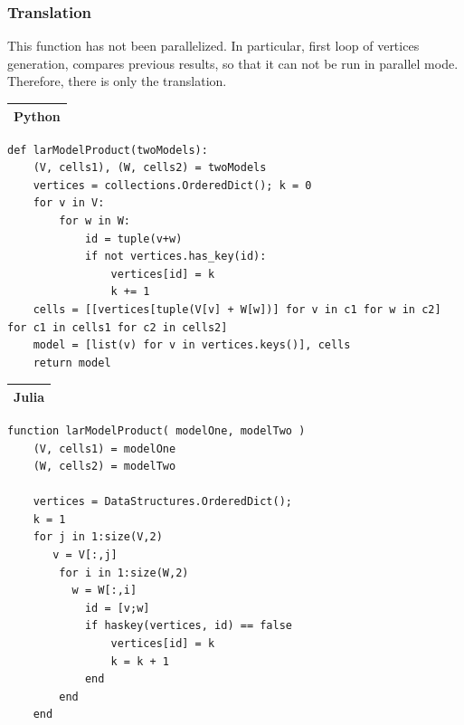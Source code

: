 \documentclass{article}
\begin{document}
\subsubsection{Translation}
This function has not been parallelized. In particular, first loop of vertices generation, compares previous results, so that it can not be run in parallel mode. Therefore, there is only the translation.
\vspace{1ex}
\begin{flushleft} \small
\begin{center}
\begin{tabular}{|p{16cm}|}
\hline
\cellcolor[gray]{.9}Python\\
\hline
\end{tabular}
\end{center}
\vspace{2ex}
\begin{list}{}{} \item
\begin{Verbatim}[tabsize=4]
def larModelProduct(twoModels):
    (V, cells1), (W, cells2) = twoModels
    vertices = collections.OrderedDict(); k = 0
    for v in V:
        for w in W:
            id = tuple(v+w)
            if not vertices.has_key(id):
                vertices[id] = k
                k += 1   
    cells = [[vertices[tuple(V[v] + W[w])] for v in c1 for w in c2] for c1 in cells1 for c2 in cells2] 
    model = [list(v) for v in vertices.keys()], cells
    return model
\end{Verbatim}
\end{list}
\vspace{2ex}
\begin{center}
\begin{tabular}{|p{16cm}|}
\hline
\cellcolor[gray]{.9}Julia\\
\hline
\end{tabular}
\end{center}
\vspace{2ex}
\begin{list}{}{} \item
\begin{Verbatim}[tabsize=4]
function larModelProduct( modelOne, modelTwo )
    (V, cells1) = modelOne
    (W, cells2) = modelTwo

    vertices = DataStructures.OrderedDict(); 
    k = 1
    for j in 1:size(V,2)
       v = V[:,j]
        for i in 1:size(W,2)
          w = W[:,i]
            id = [v;w]
            if haskey(vertices, id) == false
                vertices[id] = k
                k = k + 1
            end
        end
    end
    

\end{Verbatim}
\end{list}
\end{flushleft}
\end{document}
